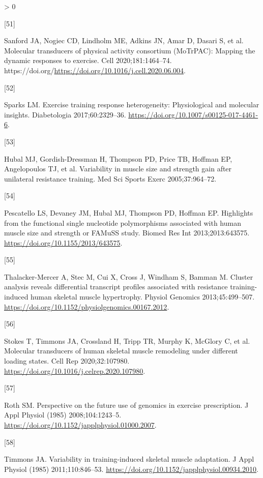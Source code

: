\documentclass[twoside,10pt]{gihclass} %
\newlength{\cslhangindent}
\newlength{\csllabelwidth}
\newenvironment{CSLReferences}[3] %
 {%
  \setlength{\parindent}{0pt}
  \ifodd #1 \everypar{\setlength{\hangindent}{\cslhangindent}}\ignorespaces\fi
  \ifnum #2 > 0
  \setlength{\parskip}{#2\baselineskip}
  \fi
 }%
 {}
\newcommand{\CSLLeftMargin}[1]{\parbox[t]{\maxof{\widthof{#1}}{\csllabelwidth}}{#1}}
\newcommand{\CSLRightInline}[1]{\parbox[t]{\linewidth}{#1}}
\begin{document}
\begin{CSLReferences}{0}{0}
\leavevmode\hypertarget{ref-RN2678}{}%
\CSLLeftMargin{{[}51{]} }
\CSLRightInline{Sanford JA, Nogiec CD, Lindholm ME, Adkins JN, Amar D, Dasari S, et al. Molecular transducers of physical activity consortium (MoTrPAC): Mapping the dynamic responses to exercise. Cell 2020;181:1464--74. https://doi.org/\url{https://doi.org/10.1016/j.cell.2020.06.004}.}

\leavevmode\hypertarget{ref-RN2677}{}%
\CSLLeftMargin{{[}52{]} }
\CSLRightInline{Sparks LM. Exercise training response heterogeneity: Physiological and molecular insights. Diabetologia 2017;60:2329--36. \url{https://doi.org/10.1007/s00125-017-4461-6}.}

\leavevmode\hypertarget{ref-RN764}{}%
\CSLLeftMargin{{[}53{]} }
\CSLRightInline{Hubal MJ, Gordish-Dressman H, Thompson PD, Price TB, Hoffman EP, Angelopoulos TJ, et al. Variability in muscle size and strength gain after unilateral resistance training. Med Sci Sports Exerc 2005;37:964--72.}

\leavevmode\hypertarget{ref-RN1263}{}%
\CSLLeftMargin{{[}54{]} }
\CSLRightInline{Pescatello LS, Devaney JM, Hubal MJ, Thompson PD, Hoffman EP. Highlights from the functional single nucleotide polymorphisms associated with human muscle size and strength or FAMuSS study. Biomed Res Int 2013;2013:643575. \url{https://doi.org/10.1155/2013/643575}.}

\leavevmode\hypertarget{ref-RN826}{}%
\CSLLeftMargin{{[}55{]} }
\CSLRightInline{Thalacker-Mercer A, Stec M, Cui X, Cross J, Windham S, Bamman M. Cluster analysis reveals differential transcript profiles associated with resistance training-induced human skeletal muscle hypertrophy. Physiol Genomics 2013;45:499--507. \url{https://doi.org/10.1152/physiolgenomics.00167.2012}.}

\leavevmode\hypertarget{ref-RN2684}{}%
\CSLLeftMargin{{[}56{]} }
\CSLRightInline{Stokes T, Timmons JA, Crossland H, Tripp TR, Murphy K, McGlory C, et al. Molecular transducers of human skeletal muscle remodeling under different loading states. Cell Rep 2020;32:107980. \url{https://doi.org/10.1016/j.celrep.2020.107980}.}

\leavevmode\hypertarget{ref-RN2698}{}%
\CSLLeftMargin{{[}57{]} }
\CSLRightInline{Roth SM. Perspective on the future use of genomics in exercise prescription. J Appl Physiol (1985) 2008;104:1243--5. \url{https://doi.org/10.1152/japplphysiol.01000.2007}.}

\leavevmode\hypertarget{ref-RN758}{}%
\CSLLeftMargin{{[}58{]} }
\CSLRightInline{Timmons JA. Variability in training-induced skeletal muscle adaptation. J Appl Physiol (1985) 2011;110:846--53. \url{https://doi.org/10.1152/japplphysiol.00934.2010}.}


\end{CSLReferences}
\end{document}

